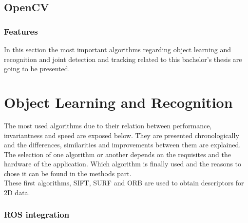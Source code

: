 \subsection{OpenCV}
\label{opencv}



\subsubsection{Features}
In this section the most important algorithms regarding object learning and recognition and joint detection and tracking related to this bachelor's thesis are going to be presented.


	\section{Object Learning and Recognition}
The most used algorithms due to their relation between performance, invariantness and speed are exposed below. They are presented chronologically and the differences, similarities and improvements between them are explained. 
\\

The selection of one algorithm or another depends on the requisites and the hardware of the application. Which algorithm is finally used and the reasons to chose it can be found in the methods part.%
\\

These first algorithms, SIFT, SURF and ORB are used to obtain descriptors for 2D data. 

		
		
		


\subsubsection{ROS integration}
